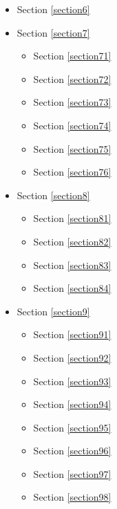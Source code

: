\documentclass[11pt]{article}
\providecommand{\tightlist}{%
      \setlength{\itemsep}{0pt}\setlength{\parskip}{0pt}}
\begin{document}
\begin{itemize}
\tightlist
\item
  Section \ref{section6}
\item
  Section \ref{section7}

  \begin{itemize}
  \tightlist
  \item
    Section \ref{section71}
  \item
    Section \ref{section72}\\
  \item
    Section \ref{section73}\\
  \item
    Section \ref{section74}
  \item
    Section \ref{section75}
  \item
    Section \ref{section76}
  \end{itemize}
\item
  Section \ref{section8}

  \begin{itemize}
  \tightlist
  \item
    Section \ref{section81}
  \item
    Section \ref{section82}
  \item
    Section \ref{section83}\\
  \item
    Section \ref{section84}\\
  \end{itemize}
\item
  Section \ref{section9}

  \begin{itemize}
  \tightlist
  \item
    Section \ref{section91}\\
  \item
    Section \ref{section92}\\
  \item
    Section \ref{section93}\\
  \item
    Section \ref{section94}\\
  \item
    Section \ref{section95}\\
  \item
    Section \ref{section96}\\
  \item
    Section \ref{section97}
  \item
    Section \ref{section98}
  \end{itemize}
\end{itemize}
\end{document}
